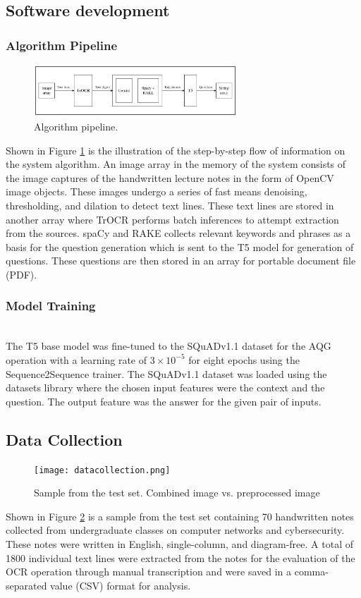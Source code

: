 \documentclass[conference]{IEEEtran}
\begin{document}
\subsection{Software development}
\subsubsection{Algorithm Pipeline}
\hfill
\begin{figure}[H]
\centerline{\includegraphics[width=3in]{pipeline.png}}
\vspace{-0.4cm}
\caption{Algorithm pipeline.} 
\label{pipeline}
\end{figure}
\indent Shown in Figure \ref{pipeline} is the illustration 
of the step-by-step flow of information on the system 
algorithm. An image array in the memory of the system consists 
of the image captures of the handwritten lecture notes in the 
form of OpenCV image objects. These images undergo 
a series of fast means denoising, thresholding, and 
dilation to detect text lines. These text lines are stored in 
another array where TrOCR performs batch inferences to attempt 
extraction from the sources. spaCy and RAKE collects 
relevant keywords and phrases as a basis for the question generation 
which is sent to the T5 model for generation of questions. 
These questions are then stored in an array for portable document 
file (PDF).
\subsubsection{Model Training}
\hfill \\ 
\indent The T5 base model was fine-tuned to the SQuADv1.1 
dataset for the AQG operation with a learning rate of 
$3 \times 10^{-5}$ for eight epochs using the Sequence2Sequence 
trainer. The SQuADv1.1 dataset was loaded using the
datasets library where the chosen input features 
were the context and the question. The output feature 
was the answer for the given pair of inputs.
\subsection{Data Collection}
\vspace{-0.2cm}
\begin{figure}[H]
\centerline{\texttt{[image: datacollection.png]}}
\vspace{-0.3cm}
\caption{Sample from the test set. Combined image vs. preprocessed image} 
\label{datacollection}
\end{figure}
\indent Shown in Figure \ref{datacollection} is a sample 
from the test set containing 70 handwritten notes collected from undergraduate
classes on computer networks and cybersecurity. These notes were
written in English, single-column, and diagram-free. A total of
1800 individual text lines were extracted from the notes for the
evaluation of the OCR operation through manual transcription
and were saved in a comma-separated value (CSV) format for 
analysis.
\end{document}
